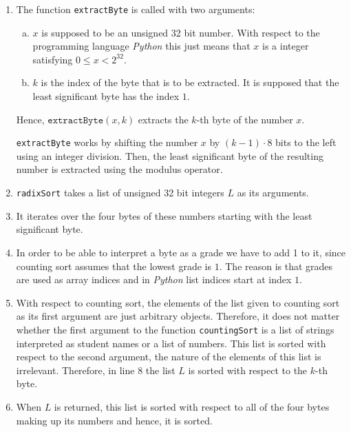 \begin{enumerate}
\item The function \texttt{extractByte} is called with two arguments:
      \begin{enumerate}[(a)]
      \item $x$ is supposed to be an unsigned 32 bit number.  With respect to the programming language
            \textsl{Python} this just means that $x$ is a integer satisfying $0 \leq x < 2^{32}$.
      \item $k$ is the index of the byte that is to be extracted.  It is supposed that the least significant
            byte has the index $1$.
      \end{enumerate}
      Hence, $\texttt{extractByte}(x, k)$ extracts the $k$-th byte of the number $x$.

      \texttt{extractByte} works by shifting the number $x$ by $(k-1) \cdot 8$ bits to the left using an
      integer division.  Then, the least significant byte of the resulting number is extracted using the modulus
      operator. 
\item \texttt{radixSort} takes a list of unsigned 32 bit integers $L$ as its arguments.
\item It iterates over the four bytes of these numbers starting with the least significant byte.
\item In order to be able to interpret a byte as a grade we have to add 1 to it, since counting sort
      assumes that the lowest grade is $1$.  The reason is that grades are used as array indices and in
      \textsl{Python} list indices start at index $1$.
\item With respect to counting sort,  the elements of the list given to counting sort as its first argument are
      just arbitrary objects.  Therefore, it does not matter whether the first argument to the function
      \texttt{countingSort} is a list of strings interpreted as student names or a list of numbers.  This list
      is sorted with respect to the second argument, the nature of the elements of this list is
      irrelevant.  Therefore, in line 8 the list $L$ is sorted with respect to the $k$-th byte. 
\item When $L$ is returned, this list is sorted with respect to all of the four bytes making up its numbers and
      hence, it is sorted.
\end{enumerate}

